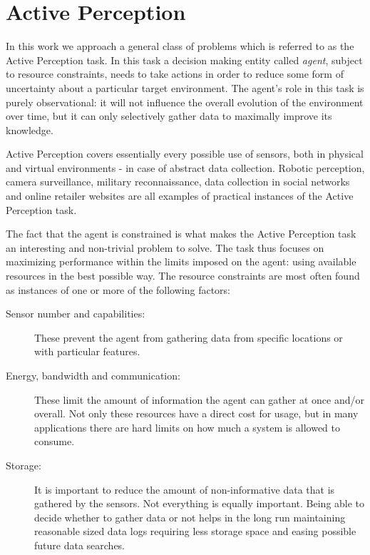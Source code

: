 \section{Active Perception}

In this work we approach a general class of problems which is referred to as the Active
Perception task. In this task a decision making entity called \textit{agent}, subject to resource
constraints, needs to take actions in order to reduce some form of uncertainty about a particular
target environment. The agent's role in this task is purely observational: it will not influence the
overall evolution of the environment over time, but it can only selectively gather data to maximally
improve its knowledge.

Active Perception covers essentially every possible use of sensors, both in physical and virtual
environments - in case of abstract data collection. Robotic perception, camera surveillance,
military reconnaissance, data collection in social networks and online retailer websites are all
examples of practical instances of the Active Perception task.

The fact that the agent is constrained is what makes the Active Perception task an interesting and
non-trivial problem to solve. The task thus focuses on maximizing performance within the limits
imposed on the agent: using available resources in the best possible way. The resource constraints
are most often found as instances of one or more of the following factors:

\begin{description}
\item[Sensor number and capabilities:] These prevent the agent from gathering data from specific
    locations or with particular features.
\item[Energy, bandwidth and communication:] These limit the amount of information the agent can
    gather at once and/or overall. Not only these resources have a direct cost for usage, but in
    many applications there are hard limits on how much a system is allowed to consume.
\item[Storage:] It is important to reduce the amount of non-informative data that is gathered by the
    sensors. Not everything is equally important. Being able to decide whether to gather data or not
    helps in the long run maintaining reasonable sized data logs requiring less storage space and
    easing possible future data searches.
\end{description}

